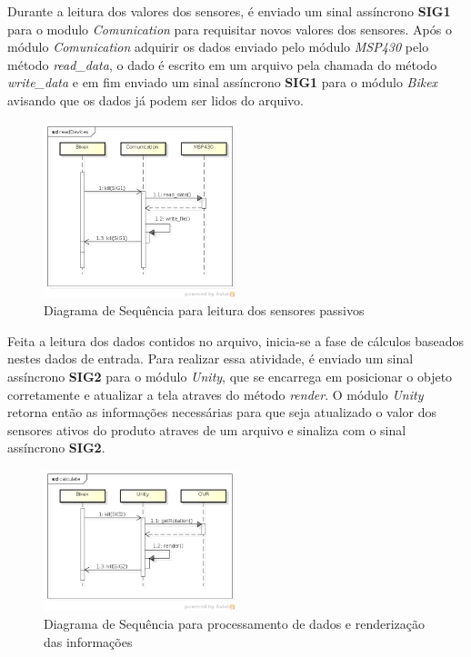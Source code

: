 Durante a leitura dos valores dos sensores, é enviado um sinal assíncrono \textbf{SIG1} para o modulo \textit{Comunication}  para requisitar novos valores dos sensores. Após o módulo \textit{Comunication} adquirir os dados enviado pelo módulo \textit{MSP430} pelo método \textit{read\_data}, o dado é escrito em um arquivo pela chamada do método \textit{write\_data} e em fim enviado um sinal assíncrono \textbf{SIG1} para o módulo \textit{Bikex} avisando que os dados já podem ser lidos do arquivo.

\begin{figure}[h]
  \centering
	\includegraphics[width=0.5\textwidth]{figuras/readDevices}
  \caption{Diagrama de Sequência para leitura dos sensores passivos}
  \label{fig:diagrama-sequencia-read-devices}
\end{figure}

Feita a leitura dos dados contidos no arquivo, inicia-se a fase de cálculos baseados nestes dados de entrada. Para realizar essa atividade, é enviado um sinal assíncrono \textbf{SIG2} para o módulo \textit{Unity}, que se encarrega em posicionar o objeto corretamente e atualizar a tela atraves do método \textit{render}. O módulo \textit{Unity} retorna então as informações necessárias para que seja atualizado o valor dos sensores ativos do produto atraves de um arquivo  e sinaliza com o sinal assíncrono \textbf{SIG2}.

\begin{figure}[h]
  \centering
	\includegraphics[width=0.5\textwidth]{figuras/calculate}
  \caption{Diagrama de Sequência para processamento de dados e renderização das informações}
  \label{fig:diagrama-sequencia-calculate}
\end{figure}

